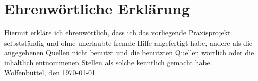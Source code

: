 \clearpage
\thispagestyle{empty}

\section*{Ehrenwörtliche Erklärung}

Hiermit erkläre ich ehrenwörtlich, dass ich das vorliegende Praxisprojekt selbstständig und ohne unerlaubte fremde Hilfe angefertigt habe, andere als die angegebenen Quellen nicht benutzt und die  benutzten Quellen wörtlich oder die inhaltlich entnommenen Stellen als solche kenntlich gemacht habe.
\vspace{4em}\\
Wolfenbüttel, den \today